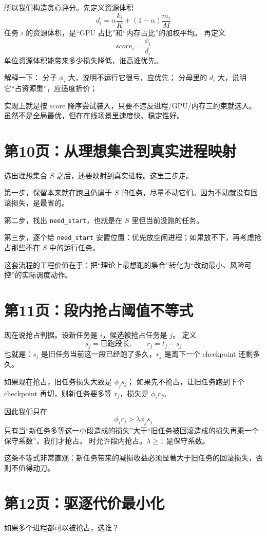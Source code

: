 \documentclass[12pt]{article}
\begin{document}
所以我们构造贪心评分。先定义资源体积
\[
d_i=\alpha\frac{k_i}{K}+(1-\alpha)\frac{m_i}{M}
\]
任务 $i$ 的资源体积，是“GPU 占比”和“内存占比”的加权平均。
再定义
\[
score_i=\frac{\phi_i}{d_i}
\]
单位资源体积能带来多少损失降低，谁高谁优先。

解释一下：
分子 $\phi_i$ 大，说明不运行它很亏，应优先；
分母里的 $d_i$ 大，说明它“占资源重”，应适度折价；

实现上就是按 score 降序尝试装入，只要不违反进程/GPU/内存三约束就选入。虽然不是全局最优，但在在线场景里速度快、稳定性好。

\section*{第10页：从理想集合到真实进程映射}
选出理想集合 $S$ 之后，还要映射到真实进程。这里三步走。

第一步，保留本来就在跑且仍属于 $S$ 的任务，尽量不动它们。因为不动就没有回滚损失，是最省的。

第二步，找出 \texttt{need\_start}，也就是在 $S$ 里但当前没跑的任务。

第三步，逐个给 \texttt{need\_start} 安置位置：优先放空闲进程；如果放不下，再考虑抢占那些不在 $S$ 中的运行任务。

这套流程的工程价值在于：把“理论上最想跑的集合”转化为“改动最小、风险可控”的实际调度动作。

\section*{第11页：段内抢占阈值不等式}
现在说抢占判据。设新任务是 $i$，候选被抢占任务是 $j$。
定义
\[
s_j=\text{已跑段长},\qquad r_j=t_j-s_j
\]
也就是：$s_j$ 是旧任务当前这一段已经跑了多久，$r_j$ 是离下一个 checkpoint 还剩多久。

如果现在抢占，旧任务损失大致是 $\phi_j s_j$；
如果先不抢占，让旧任务跑到下个 checkpoint 再切，则新任务要多等 $r_j$，损失是 $\phi_i r_j$。

因此我们只在
\[
\phi_i r_j>\lambda\phi_j s_j
\]
只有当“新任务多等这一小段造成的损失”大于“旧任务被回滚造成的损失再乘一个保守系数”，我们才抢占。
时允许段内抢占。$\lambda\ge 1$ 是保守系数。

这条不等式非常直观：新任务带来的减损收益必须显著大于旧任务的回滚损失，否则不值得动刀。

\section*{第12页：驱逐代价最小化}
如果多个进程都可以被抢占，选谁？
\end{document}
